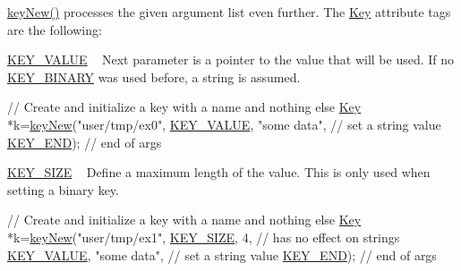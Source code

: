 \hyperlink{group__key_gad23c65b44bf48d773759e1f9a4d43b89}{key\+New()} processes the given argument list even further. The \hyperlink{classkdb_1_1Key}{Key} attribute tags are the following\+:
\begin{DoxyItemize}
\item \hyperlink{group__key_gga91fb3178848bd682000958089abbaf40ac66e4a49d09212b79f5754ca6db5bd2e}{K\+E\+Y\+\_\+\+V\+A\+L\+UE} ~\newline
 Next parameter is a pointer to the value that will be used. If no \hyperlink{group__key_gga91fb3178848bd682000958089abbaf40a1ca18d4e094ae7487d35ecedda2235ff}{K\+E\+Y\+\_\+\+B\+I\+N\+A\+RY} was used before, a string is assumed. 
\begin{DoxyCodeInclude}
\textcolor{comment}{// Create and initialize a key with a name and nothing else}
\hyperlink{classkdb_1_1Key_a5679f5cae63caddd64a60388b9cc77fa}{Key} *k=\hyperlink{group__key_gad23c65b44bf48d773759e1f9a4d43b89}{keyNew}(\textcolor{stringliteral}{"user/tmp/ex0"},
        \hyperlink{group__key_gga91fb3178848bd682000958089abbaf40ac66e4a49d09212b79f5754ca6db5bd2e}{KEY\_VALUE}, \textcolor{stringliteral}{"some data"},    \textcolor{comment}{// set a string value}
        \hyperlink{group__key_gga91fb3178848bd682000958089abbaf40aa8adb6fcb92dec58fb19410eacfdd403}{KEY\_END});                  \textcolor{comment}{// end of args}
\end{DoxyCodeInclude}

\item \hyperlink{group__key_gga91fb3178848bd682000958089abbaf40a6d531b5c41445d19d0452eebdccbfa01}{K\+E\+Y\+\_\+\+S\+I\+ZE} ~\newline
 Define a maximum length of the value. This is only used when setting a binary key. 
\begin{DoxyCodeInclude}
\textcolor{comment}{// Create and initialize a key with a name and nothing else}
\hyperlink{classkdb_1_1Key_a5679f5cae63caddd64a60388b9cc77fa}{Key} *k=\hyperlink{group__key_gad23c65b44bf48d773759e1f9a4d43b89}{keyNew}(\textcolor{stringliteral}{"user/tmp/ex1"},
        \hyperlink{group__key_gga91fb3178848bd682000958089abbaf40a6d531b5c41445d19d0452eebdccbfa01}{KEY\_SIZE}, 4,               \textcolor{comment}{// has no effect on strings}
        \hyperlink{group__key_gga91fb3178848bd682000958089abbaf40ac66e4a49d09212b79f5754ca6db5bd2e}{KEY\_VALUE}, \textcolor{stringliteral}{"some data"},    \textcolor{comment}{// set a string value}
        \hyperlink{group__key_gga91fb3178848bd682000958089abbaf40aa8adb6fcb92dec58fb19410eacfdd403}{KEY\_END});                  \textcolor{comment}{// end of args}
\end{DoxyCodeInclude}


\end{DoxyItemize}
